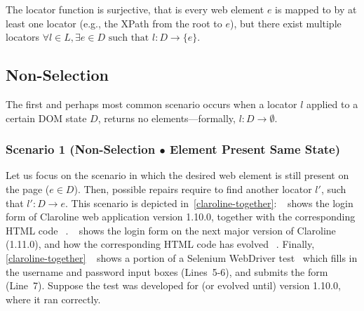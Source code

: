 The locator function is surjective, that is every web element $e$ is mapped to by at least one locator (e.g., the XPath from the root to $e$), but there exist multiple locators {$\displaystyle \forall l\in L,\exists e\in D{\text{ such that }} l: D \rightarrow \{e\}$}.

%

\subsection{Non-Selection}\label{sec:nonselection}

The first and perhaps most common scenario occurs when a locator $l$ applied to a certain DOM state $D$, returns no elements---formally, $l: D \rightarrow \emptyset$. 
%

\subsubsection{Scenario 1 (Non-Selection $\bullet$ Element Present Same State)} 
Let us focus on the scenario in which the desired web element is still present on the page ($e \in D$). 
Then, possible repairs require to find another locator $l'$, such that $l': D \rightarrow e$.
This scenario is depicted in~\autoref{claroline-together}: \textcircled{}~shows the login form of Claroline web application version 1.10.0, together with the corresponding HTML code~\textcircled{}. \textcircled{}~shows the login form on the next major version of Claroline (1.11.0), and how the corresponding HTML code has evolved~\textcircled{}. 
Finally, \autoref{claroline-together}~\textcircled{} shows a portion of a Selenium WebDriver test~\cite{selenium} which fills in the username and password input boxes (Lines~5-6), and submits the form (Line~7). Suppose the test was developed for (or evolved until) version 1.10.0, where it ran correctly.

